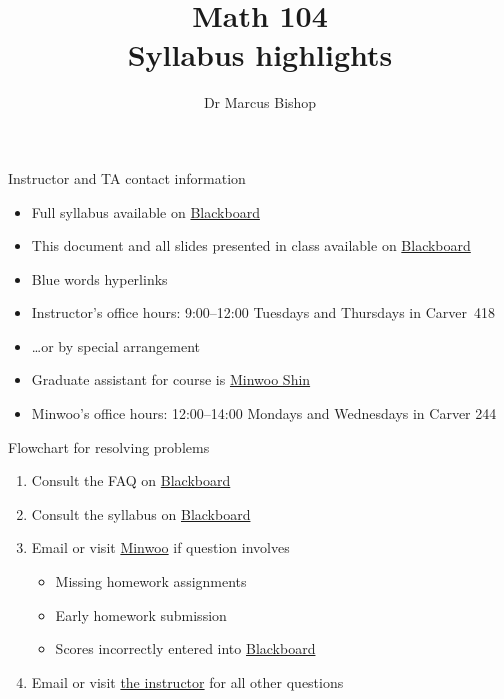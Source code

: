 \documentclass[xcolor=dvipsnames]{beamer}
\title[Syllabus highlights]{Math 104\\Syllabus highlights}
\author{Dr Marcus Bishop}
\theoremstyle{definition}
\begin{document}
\begin{frame}\titlepage\end{frame}
\LogoOff

\begin{frame}{Instructor and TA contact information}
\begin{itemize}
\item Full syllabus available on
\href{https://bb.its.iastate.edu}{\color{blue} Blackboard}
\item This document and all slides presented in class
available on
\href{https://bb.its.iastate.edu}{\color{blue} Blackboard}
\item Blue words hyperlinks
\item Instructor's office hours:
9:00--12:00 Tuesdays and Thursdays in Carver~418
\item \dots or by special arrangement
\item Graduate assistant for course is
\href{mailto:mws@iastate.edu}{\color{blue} Minwoo Shin}
\item Minwoo's office hours:
12:00--14:00 Mondays and Wednesdays in Carver 244
\end{itemize}
\end{frame}

\begin{frame}{Flowchart for resolving problems}
\begin{enumerate}
\item Consult the FAQ on
\href{https://bb.its.iastate.edu}{\color{blue} Blackboard}
\item Consult the syllabus on
\href{https://bb.its.iastate.edu}{\color{blue} Blackboard}
\item Email or visit \href{mailto:mws@iastate.edu}{\color{blue}Minwoo}
if question involves
\begin{itemize}
\item Missing homework assignments
\item Early homework submission
\item Scores incorrectly entered into
\href{https://bb.its.iastate.edu}{\color{blue} Blackboard}
\end{itemize}
\item Email or visit \href{mailto:mbishop@iastate.edu}{\color{blue}the instructor}
for all other questions
\end{enumerate}
\end{frame}
\end{document}
